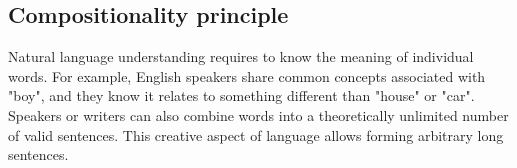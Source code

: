 
\subsection{Compositionality principle}

Natural language understanding requires to know the meaning of individual words. For example, English speakers share common concepts associated with "boy", and they know it relates to something different than "house" or "car". Speakers or writers can also combine words into a theoretically unlimited number of valid sentences. This creative aspect of language allows forming arbitrary long sentences. 

